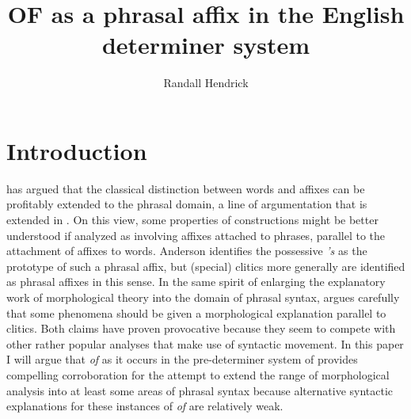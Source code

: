 \documentclass[output=paper,
modfonts
]{LSP/langsci}
\title{OF as a phrasal affix in the English determiner system}
\author{Randall Hendrick\affiliation{University of North Carolina at Chapel Hill}}
\begin{document}
\maketitle 

\section{Introduction}

{\citet{Anderson92}} has argued that the classical distinction between words and affixes can be profitably extended to the phrasal domain, a line of argumentation that is extended in {\citet{Anderson05}}.  On this view, some properties of constructions might be better understood if analyzed as involving affixes attached to phrases, parallel to the attachment of affixes to words.   Anderson identifies the possessive {\textit{'s}} as the prototype of such a phrasal affix, but  (special) clitics more generally are identified as phrasal affixes in this sense.  In the same spirit of enlarging the explanatory work of morphological theory into the domain of phrasal syntax, {\citet{Anderson05}} argues carefully that some  phenomena should be given a morphological explanation parallel to  clitics.  Both claims have proven provocative because they seem to compete with other rather popular analyses that make use of syntactic movement.  In this paper I will argue that {\textit{of}} as it occurs in the pre-determiner system of  provides compelling corroboration for the attempt to extend the range of morphological analysis into at least some areas of phrasal syntax because alternative syntactic explanations for these instances of {\textit{of}} are relatively weak.
\end{document}
